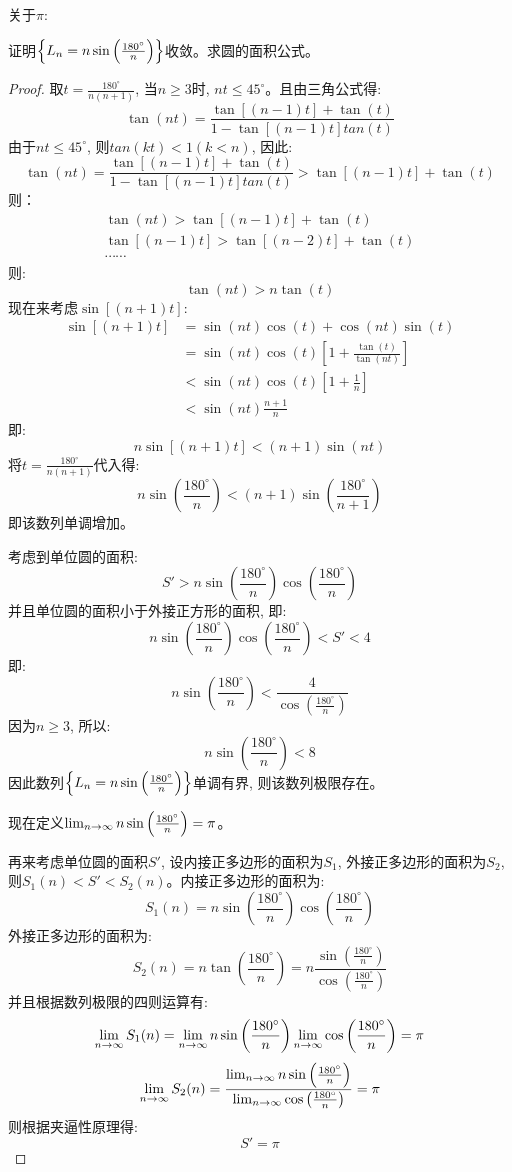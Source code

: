 关于$\pi$:
\begin{proposition}
    证明$\left\{ L_n = n\sin \left ( \frac{180^\circ}{n} \right )\right\}$收敛。求圆的面积公式。
\end{proposition}
\begin{proof}
取$t = \frac{180^\circ}{n(n+1)}$, 当$n \ge 3$时, $nt \le 45^\circ$。且由三角公式得: 
\[ \tan (nt) = \frac{\tan[(n-1)t] + \tan(t)}{1 - \tan[(n-1)t]tan(t)} \]
由于$nt \le 45^\circ$, 则$tan(kt) < 1(k < n)$, 因此: 
\[ \tan (nt) = \frac{\tan[(n-1)t] + \tan(t)}{1 - \tan[(n-1)t]tan(t)} > \tan[(n-1)t] + \tan(t)\]
则：
\begin{gather*}
    \tan(nt) > \tan[(n-1)t] + \tan(t) \\ 
    \tan[(n-1)t] > \tan[(n-2)t] + \tan(t) \\
    \cdots \cdots
\end{gather*}
则: 
\[ \tan(nt) > n\tan(t)\]
现在来考虑$\sin[(n+1)t]$: 
\[
\begin{split}
    \sin[(n+1)t] &= \sin(nt)\cos(t) + \cos(nt)\sin(t) \\
                &= \sin(nt)\cos(t)\left[ 1 + \frac{\tan(t)}{\tan(nt)}\right] \\
                &< \sin(nt)\cos(t)\left[ 1 + \frac{1}{n} \right] \\
                & < \sin(nt)\frac{n+1}{n}
\end{split}
\]
即: 
\[ n\sin[(n+1)t] < (n+1)\sin(nt) \]
将$t = \frac{180^\circ}{n(n+1)}$代入得: 
\[ n\sin\left( \frac{180^\circ}{n}\right) < (n + 1)\sin\left( \frac{180^\circ}{n+1} \right)\]
即该数列单调增加。

考虑到单位圆的面积: 
\[ S' > n \sin\left( \frac{180^\circ}{n}\right) \cos\left( \frac{180^\circ}{n}\right) \]
并且单位圆的面积小于外接正方形的面积, 即: 
\[ n \sin\left( \frac{180^\circ}{n}\right) \cos\left( \frac{180^\circ}{n}\right) < S' < 4 \]
即: 
\[ n\sin\left( \frac{180^\circ}{n}\right) < \frac{4}{\cos\left( \frac{180^\circ}{n}\right)}\]
因为$n \ge 3$, 所以: 
\[ n\sin\left( \frac{180^\circ}{n}\right) < 8\]
因此数列$\left\{ L_n = n\sin \left ( \frac{180^\circ}{n} \right )\right\}$单调有界, 则该数列极限存在。

现在定义$\lim_{n \to \infty } n\sin \left ( \frac{180^\circ}{n} \right ) = \pi$。

再来考虑单位圆的面积$S'$, 设内接正多边形的面积为$S_1$, 外接正多边形的面积为$S_2$, 则$S_1(n) < S' < S_2(n)$。内接正多边形的面积为:
\[ S_1(n) = n \sin\left( \frac{180^\circ}{n}\right) \cos\left( \frac{180^\circ}{n}\right)\]
外接正多边形的面积为: 
\[ S_2(n) = n \tan\left( \frac{180^\circ}{n}\right)  = n \frac{\sin\left( \frac{180^\circ}{n}\right)}{\cos\left( \frac{180^\circ}{n}\right)} \]
并且根据数列极限的四则运算有:
\[ \lim_{n \to \infty } S_1(n) = \lim_{n \to \infty } n \sin\left( \frac{180^\circ}{n}\right) \lim_{n \to \infty } \cos\left( \frac{180^\circ}{n}\right) = \pi\]
\[ \lim_{n \to \infty } S_2(n) = \frac{\lim_{n \to \infty } n\sin\left( \frac{180^\circ}{n}\right)}{\lim_{n \to \infty } \cos\left( \frac{180^\circ}{n}\right)} = \pi\]
则根据夹逼性原理得:
\[ S' = \pi \]


\end{proof}
